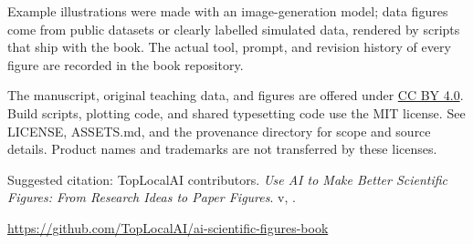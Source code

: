 \documentclass[11pt,openany]{book}
\begin{document}
Example illustrations were made with an image-generation model; data figures come from public datasets or clearly labelled simulated data, rendered by scripts that ship with the book. The actual tool, prompt, and revision history of every figure are recorded in the book repository.

The manuscript, original teaching data, and figures are offered under \href{https://creativecommons.org/licenses/by/4.0/}{CC BY 4.0}. Build scripts, plotting code, and shared typesetting code use the MIT license. See LICENSE, ASSETS.md, and the provenance directory for scope and source details. Product names and trademarks are not transferred by these licenses.

Suggested citation: TopLocalAI contributors. \emph{Use AI to Make Better Scientific Figures: From Research Ideas to Paper Figures}. v\bookversion, \bookdate.

\url{https://github.com/TopLocalAI/ai-scientific-figures-book}
\begingroup\small\linespread{1.0}\selectfont
\setlength{\parskip}{0pt}
\tableofcontents
\endgroup

\mainmatter













\appendix

\backmatter

\end{document}
